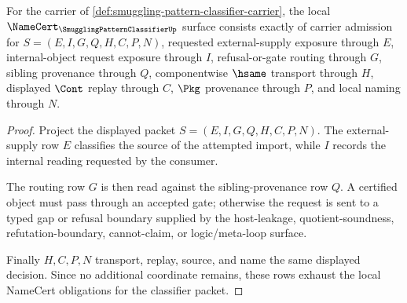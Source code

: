 \begin{theorem}
\label{thm:smuggling-pattern-classifier-namecert-obligations}
For the carrier of \autoref{def:smuggling-pattern-classifier-carrier}, the local $\NameCert_{\SmugglingPatternClassifierUp}$ surface consists exactly of carrier admission for $S=(E,I,G,Q,H,C,P,N)$, requested external-supply exposure through $E$, internal-object request exposure through $I$, refusal-or-gate routing through $G$, sibling provenance through $Q$, componentwise $\hsame$ transport through $H$, displayed $\Cont$ replay through $C$, $\Pkg$ provenance through $P$, and local naming through $N$.
\end{theorem}
\begin{proof}
Project the displayed packet $S=(E,I,G,Q,H,C,P,N)$. The external-supply row $E$ classifies the source of the attempted import, while $I$ records the internal reading requested by the consumer.

The routing row $G$ is then read against the sibling-provenance row $Q$. A certified object must pass through an accepted gate; otherwise the request is sent to a typed gap or refusal boundary supplied by the host-leakage, quotient-soundness, refutation-boundary, cannot-claim, or logic/meta-loop surface.

Finally $H,C,P,N$ transport, replay, source, and name the same displayed decision. Since no additional coordinate remains, these rows exhaust the local NameCert obligations for the classifier packet.
\end{proof}

